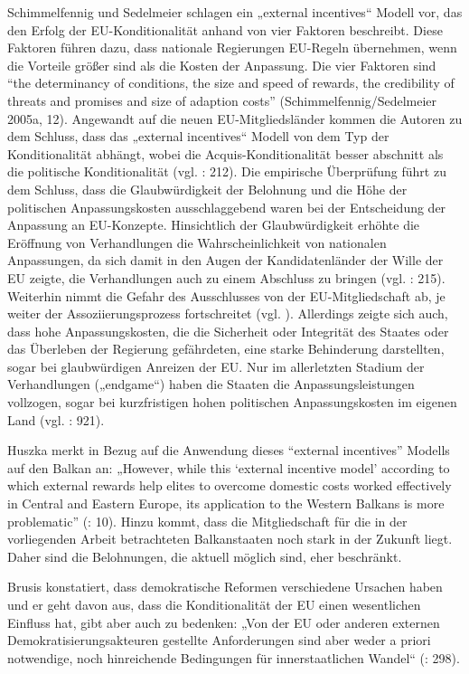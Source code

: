 Schimmelfennig und Sedelmeier schlagen ein „external incentives“ Modell vor, das den Erfolg der EU-Konditionalität anhand von vier Faktoren beschreibt. Diese Faktoren führen dazu, dass nationale Regierungen EU-Regeln übernehmen, wenn die Vorteile größer sind als die Kosten der Anpassung. Die vier Faktoren sind “the determinancy of conditions, the size and speed of rewards, the credibility of threats and promises and size of adaption costs” (Schimmelfennig/Sedelmeier 2005a, 12). Angewandt auf die neuen EU-Mitgliedsländer kommen die Autoren zu dem Schluss, dass das „external incentives“ Modell von dem Typ der Konditionalität abhängt, wobei die Acquis-Konditionalität besser abschnitt als die politische Konditionalität (vgl. \cite{schsed05c}: 212). Die empirische Überprüfung führt zu dem Schluss, dass die Glaubwürdigkeit der Belohnung und die Höhe der politischen Anpassungskosten ausschlaggebend waren bei der Entscheidung der Anpassung an EU-Konzepte. Hinsichtlich der Glaubwürdigkeit erhöhte die Eröffnung von Verhandlungen die Wahrscheinlichkeit von nationalen Anpassungen, da sich damit in den Augen der Kandidatenländer der Wille der EU zeigte, die Verhandlungen auch zu einem Abschluss zu bringen (vgl. \cite{schsed05c}: 215). Weiterhin nimmt die Gefahr des Ausschlusses von der EU-Mitgliedschaft ab, je weiter der Assoziierungsprozess fortschreitet (vgl. \cite{dimit05}). Allerdings zeigte sich auch, dass hohe Anpassungskosten, die die Sicherheit oder Integrität des Staates oder das Überleben der Regierung gefährdeten, eine starke Behinderung darstellten, sogar bei glaubwürdigen Anreizen der EU. Nur im allerletzten Stadium der Verhandlungen („endgame“) haben die Staaten die Anpassungsleistungen vollzogen, sogar bei kurzfristigen hohen politischen Anpassungskosten im eigenen Land (vgl. \cite{schetal}: 921).\par

Huszka merkt in Bezug auf die Anwendung dieses “external incentives” Modells auf den Balkan an: „However, while this ‘external incentive model’ according to which external rewards help elites to overcome domestic costs worked effectively in Central and Eastern Europe, its application to the Western Balkans is more problematic” (\cite{huszka}: 10). Hinzu kommt, dass die Mitgliedschaft für die in der vorliegenden Arbeit betrachteten Balkanstaaten noch stark in der Zukunft liegt. Daher sind die Belohnungen, die aktuell möglich sind, eher beschränkt.\par

Brusis konstatiert, dass demokratische Reformen verschiedene Ursachen haben und er geht davon aus, dass die Konditionalität der EU einen wesentlichen Einfluss hat, gibt aber auch zu bedenken: „Von der EU oder anderen externen Demokratisierungsakteuren gestellte Anforderungen sind aber weder a priori notwendige, noch hinreichende Bedingungen für innerstaatlichen Wandel“ (\cite{brusis05}: 298).

